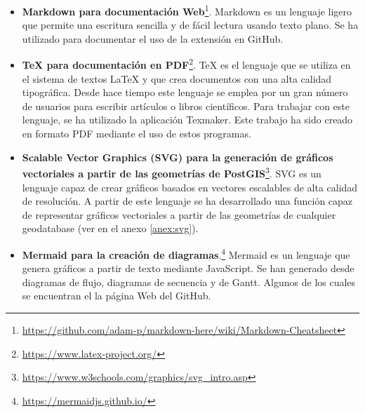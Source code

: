 \begin{itemize}
\item\textbf{Markdown para documentación Web}\footnote{\url{https://github.com/adam-p/markdown-here/wiki/Markdown-Cheatsheet}}. Markdown es un lenguaje ligero que permite una escritura sencilla y de fácil lectura usando texto plano. Se ha utilizado para documentar el uso de la extensión en GitHub.
\item\textbf{TeX para documentación en PDF}\footnote{\url{https://www.latex-project.org/}}. TeX es el lenguaje que se utiliza en el sistema de textos LaTeX y que crea documentos con una alta calidad tipográfica. Desde hace tiempo este lenguaje se emplea por un gran número de usuarios para escribir artículos o libros científicos. Para trabajar con este lenguaje, se ha utilizado la aplicación Texmaker. Este trabajo ha sido creado en formato PDF mediante el uso de estos programas.
\item\textbf{Scalable Vector Graphics (SVG) para la generación de gráficos vectoriales a partir de las geometrías de PostGIS}\footnote{\url{https://www.w3schools.com/graphics/svg_intro.asp}}. SVG es un lenguaje capaz de crear gráficos basados en vectores escalables de alta calidad de resolución. A partir de este lenguaje se ha desarrollado una función capaz de representar gráficos vectoriales a partir de las geometrías de cualquier geodatabase (ver en el anexo \ref{anex:svg}).
\item\textbf{Mermaid para la creación de diagramas}.\footnote{\url{https://mermaidjs.github.io/}} Mermaid es un lenguaje que genera gráficos a partir de texto mediante JavaScript. Se han generado desde diagramas de flujo, diagramas de secuencia y de Gantt. Algunos de los cuales se encuentran el la página Web del GitHub.
\end{itemize}
